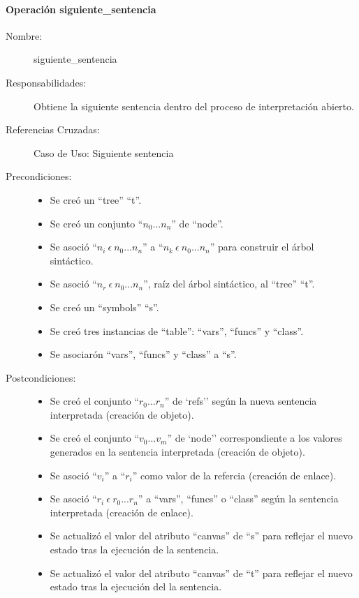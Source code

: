 \paragraph{Operación siguiente\_sentencia}
\FloatBarrier
\begin{framed}
	\begin{description}
		\item [Nombre:] siguiente\_sentencia
		\item [Responsabilidades:] Obtiene la siguiente sentencia dentro del proceso de interpretación abierto.
		\item [Referencias Cruzadas: ] Caso de Uso: Siguiente sentencia
      \item [Precondiciones:] \hfill
         \begin {itemize}
         \item Se creó un ``tree'' ``t''.
         \item Se creó un conjunto ``$n_0...n_n$'' de ``node''.
         \item Se asoció ``$n_i\ \epsilon\ n_0...n_n$'' a ``$n_k\ \epsilon\ n_0...n_n$'' para construir el árbol sintáctico.
         \item Se asoció  ``$n_r\ \epsilon\ n_0...n_n$'', raíz del árbol sintáctico, al ``tree'' ``t''.
         \item Se creó un ``symbols'' ``s''.
         \item Se creó tres instancias de ``table'': ``vars'', ``funcs'' y ``class''.
         \item Se asociarón ``vars'', ``funcs'' y ``class'' a ``s''.
      \end{itemize}
      \item [Postcondiciones:] \hfill
      \begin {itemize}
         \item Se creó el conjunto ``$r_0...r_n$'' de `refs'' según la nueva sentencia interpretada (creación de objeto).
         \item Se creó el conjunto ``$v_0...v_m$'' de `node'' correspondiente a los valores generados en la sentencia  interpretada (creación de objeto).
         \item Se asoció ``$v_i$'' a ``$r_i$'' como valor de la refercia (creación de enlace).
         \item Se asoció ``$r_i\ \epsilon \ r_0...r_n$'' a ``vars'', ``funcs'' o ``class'' según la sentencia interpretada (creación de enlace).  
         \item Se actualizó el valor del atributo ``canvas'' de ``s'' para reflejar el nuevo estado tras la ejecución de la sentencia.
         \item Se actualizó el valor del atributo ``canvas'' de ``t'' para reflejar el nuevo estado tras la ejecución del la sentencia.
      \end{itemize}
	\end{description}
\end{framed}
\FloatBarrier

